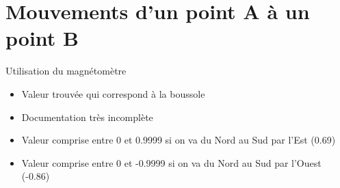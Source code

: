\documentclass[12pt]{beamer}
\begin{document}
	\section{Mouvements d'un point A à un point B}
	\begin{frame}[allowframebreaks]
	    
	     \begin{block}{Utilisation du magnétomètre}
	        \begin{itemize}
	            [triangle]
	            \item Valeur trouvée qui correspond à la boussole
	            \item Documentation très incomplète
	            \item Valeur comprise entre 0 et 0.9999 si on va du Nord au Sud par l'Est (0.69)
	            \item Valeur comprise entre 0 et -0.9999 si on va du Nord au Sud par l'Ouest (-0.86)
	        \end{itemize}
	    \end{block}
	\end{frame}
\end{document}
